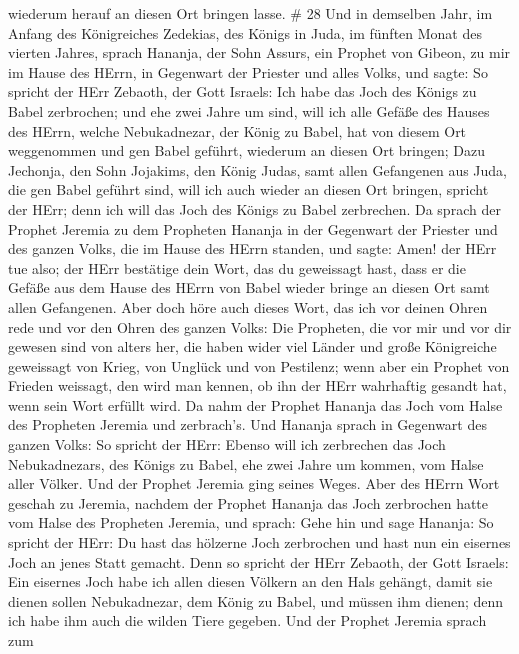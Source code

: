 wiederum herauf an diesen Ort bringen lasse. \# 28  Und in
demselben Jahr, im Anfang des Königreiches Zedekias, des Königs in Juda,
im fünften Monat des vierten Jahres, sprach Hananja, der Sohn Assurs,
ein Prophet von Gibeon, zu mir im Hause des HErrn, in Gegenwart der
Priester und alles Volks, und sagte:  So spricht der HErr
Zebaoth, der Gott Israels: Ich habe das Joch des Königs zu Babel
zerbrochen;  und ehe zwei Jahre um sind, will ich alle
Gefäße des Hauses des HErrn, welche Nebukadnezar, der König zu Babel,
hat von diesem Ort weggenommen und gen Babel geführt, wiederum an diesen
Ort bringen;  Dazu Jechonja, den Sohn Jojakims, den König
Judas, samt allen Gefangenen aus Juda, die gen Babel geführt sind, will
ich auch wieder an diesen Ort bringen, spricht der HErr; denn ich will
das Joch des Königs zu Babel zerbrechen.  Da sprach der
Prophet Jeremia zu dem Propheten Hananja in der Gegenwart der Priester
und des ganzen Volks, die im Hause des HErrn standen,  und
sagte: Amen! der HErr tue also; der HErr bestätige dein Wort, das du
geweissagt hast, dass er die Gefäße aus dem Hause des HErrn von Babel
wieder bringe an diesen Ort samt allen Gefangenen.  Aber
doch höre auch dieses Wort, das ich vor deinen Ohren rede und vor den
Ohren des ganzen Volks:  Die Propheten, die vor mir und vor
dir gewesen sind von alters her, die haben wider viel Länder und große
Königreiche geweissagt von Krieg, von Unglück und von Pestilenz;
 wenn aber ein Prophet von Frieden weissagt, den wird man
kennen, ob ihn der HErr wahrhaftig gesandt hat, wenn sein Wort erfüllt
wird.  Da nahm der Prophet Hananja das Joch vom Halse des
Propheten Jeremia und zerbrach's.  Und Hananja sprach in
Gegenwart des ganzen Volks: So spricht der HErr: Ebenso will ich
zerbrechen das Joch Nebukadnezars, des Königs zu Babel, ehe zwei Jahre
um kommen, vom Halse aller Völker. Und der Prophet Jeremia ging seines
Weges.  Aber des HErrn Wort geschah zu Jeremia, nachdem der
Prophet Hananja das Joch zerbrochen hatte vom Halse des Propheten
Jeremia, und sprach:  Gehe hin und sage Hananja: So spricht
der HErr: Du hast das hölzerne Joch zerbrochen und hast nun ein eisernes
Joch an jenes Statt gemacht.  Denn so spricht der HErr
Zebaoth, der Gott Israels: Ein eisernes Joch habe ich allen diesen
Völkern an den Hals gehängt, damit sie dienen sollen Nebukadnezar, dem
König zu Babel, und müssen ihm dienen; denn ich habe ihm auch die wilden
Tiere gegeben.  Und der Prophet Jeremia sprach zum
